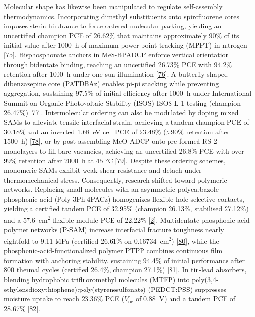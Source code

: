 \documentclass[
  11pt,
]{article}
\begin{document}
Molecular shape has likewise been manipulated to regulate self-assembly
thermodynamics. Incorporating dimethyl substituents onto spirofluorene
cores imposes steric hindrance to force ordered molecular packing,
yielding an uncertified champion PCE of 26.62\% that maintains
approximately 90\% of its initial value after \qty{1000}{\hour} of
maximum power point tracking (MPPT) in nitrogen
{[}\href{https://doi.org/10.1002/aenm.71005}{75}{]}. Bisphosphonate
anchors in MeS-BPADCP enforce vertical orientation through bidentate
binding, reaching an uncertified 26.73\% PCE with 94.2\% retention after
\qty{1000}{\hour} under one-sun illumination
{[}\href{https://doi.org/10.1002/aenm.70814}{76}{]}. A butterfly-shaped
dibenzazepine core (PATDBAz) enables pi-pi stacking while preventing
aggregation, sustaining 97.5\% of initial efficiency after
\qty{1000}{\hour} under International Summit on Organic Photovoltaic
Stability (ISOS) ISOS-L-1 testing (champion 26.47\%)
{[}\href{https://doi.org/10.1002/smll.74278}{77}{]}. Intermolecular
ordering can also be modulated by doping mixed SAMs to alleviate tensile
interfacial strain, achieving a tandem champion PCE of 30.18\% and an
inverted \qty{1.68}{\electronvolt} cell PCE of 23.48\% (\textgreater90\%
retention after \qty{1500}{\hour})
{[}\href{https://doi.org/10.1002/smll.74319}{78}{]}, or by
post-assembling MeO-ADCP onto pre-formed RS-2 monolayers to fill bare
vacancies, achieving an uncertified 26.8\% PCE with over 99\% retention
after \qty{2000}{\hour} at 45 °C
{[}\href{https://doi.org/10.1021/acs.jpclett.6c01042}{79}{]}. Despite
these ordering schemes, monomeric SAMs exhibit weak shear resistance and
detach under thermomechanical stress. Consequently, research shifted
toward polymeric networks. Replacing small molecules with an asymmetric
polycarbazole phosphonic acid (Poly-3Ph-4PACz) homogenizes flexible
hole-selective contacts, yielding a certified tandem PCE of 32.95\%
(champion 26.13\%, stabilised 27.12\%) and a
\qty{57.6}{\centi\meter\squared} flexible module PCE of 22.22\%
{[}\href{https://doi.org/10.1038/s41467-026-73276-w}{2}{]}. Multidentate
phosphonic acid polymer networks (P-SAM) increase interfacial fracture
toughness nearly eightfold to 9.11 MPa (certified 26.61\% on
\qty{0.06734}{\centi\meter\squared})
{[}\href{https://doi.org/10.1002/aenm.71159}{80}{]}, while the
phosphonic-acid-functionalized polymer PTPP combines continuous film
formation with anchoring stability, sustaining 94.4\% of initial
performance after 800 thermal cycles (certified 26.4\%, champion 27.1\%)
{[}\href{https://doi.org/10.1002/adfm.75697}{81}{]}. In tin-lead
absorbers, blending hydrophobic trifluoromethyl molecules (MTFP) into
poly(3,4-ethylenedioxythiophene):poly(styrenesulfonate) (PEDOT:PSS)
suppresses moisture uptake to reach 23.36\% PCE (\(V_\mathrm{oc}\) of
\qty{0.88}{\volt}) and a tandem PCE of 28.67\%
{[}\href{https://doi.org/10.1002/aenm.70910}{82}{]}.
\end{document}
